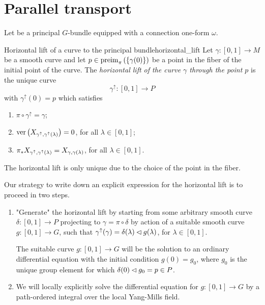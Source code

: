 \section{Parallel transport}
Let  be a principal \(G\)-bundle equipped with a connection one-form \(\omega\). \todo[introduce]

\begin{definition}{Horizontal lift of a curve to the principal bundle}{horizontal_lift}
    Let \(\gamma : [0,1] \to M\) be a smooth curve and let \(p \in \operatorname{preim}_{\pi}{\left(\{\gamma(0)\}\right)}\) be a point in the fiber of the initial point of the curve. The \emph{horizontal lift of the curve \(\gamma\) through the point \(p\)} is the unique curve
    \begin{equation*}
        \gamma^\uparrow : [0,1] \to P
    \end{equation*}
    with \(\gamma^\uparrow(0) = p\) which satisfies
    \begin{enumerate}[label=(\alph*)]
        \item \(\pi \circ \gamma^\uparrow = \gamma\);
        \item \(\operatorname{ver}\left(X_{\gamma^\uparrow, \gamma^\uparrow(\lambda)}\right) = 0\), for all \(\lambda \in [0,1]\);
        \item \({\pi}_{\ast{}}{X_{\gamma^\uparrow, \gamma^\uparrow(\lambda)}} = X_{\gamma, \gamma(\lambda)}\), for all \(\lambda \in [0,1]\).
    \end{enumerate}
\end{definition}
\begin{remark}
    The horizontal lift is only unique due to the choice of the point in the fiber.
\end{remark}

Our strategy to write down an explicit expression for the horizontal lift is to proceed in two steps.
\begin{enumerate}[label=(\alph*)]
    \item "Generate" the horizontal lift by starting from some arbitrary smooth curve \(\delta : [0,1] \to P\) projecting to \(\gamma = \pi \circ \delta\) by action of a suitable smooth curve \(g : [0,1] \to G\), such that \(\gamma^\uparrow(\gamma) = \delta(\lambda) \mathbin{\vartriangleleft} g(\lambda)\), for \(\lambda \in [0,1]\).

    The suitable curve \(g : [0,1] \to G\) will be the solution to an ordinary differential equation with the initial condition \(g(0) = g_0\), where \(g_0\) is the unique group element for which \(\delta(0) \mathbin{\vartriangleleft} g_0 = p \in P\).
    \item We will locally explicitly solve the differential equation for \(g : [0,1]\to G\) by a path-ordered integral over the local Yang-Mills field.
\end{enumerate}

